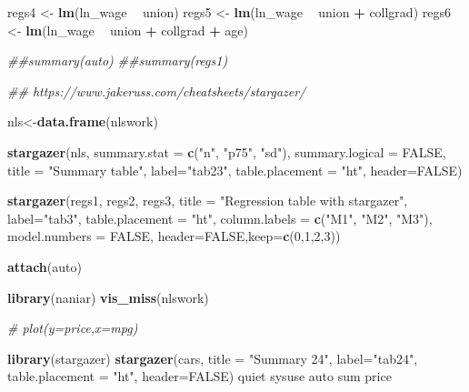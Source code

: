 \documentclass[
  12pt,
]{article}
\newenvironment{Shaded}{\begin{snugshade}}{\end{snugshade}}
\newcommand{\CommentTok}[1]{\textcolor[rgb]{0.56,0.35,0.01}{\textit{#1}}}
\newcommand{\DataTypeTok}[1]{\textcolor[rgb]{0.13,0.29,0.53}{#1}}
\newcommand{\DecValTok}[1]{\textcolor[rgb]{0.00,0.00,0.81}{#1}}
\newcommand{\KeywordTok}[1]{\textcolor[rgb]{0.13,0.29,0.53}{\textbf{#1}}}
\newcommand{\NormalTok}[1]{#1}
\newcommand{\OperatorTok}[1]{\textcolor[rgb]{0.81,0.36,0.00}{\textbf{#1}}}
\newcommand{\OtherTok}[1]{\textcolor[rgb]{0.56,0.35,0.01}{#1}}
\newcommand{\StringTok}[1]{\textcolor[rgb]{0.31,0.60,0.02}{#1}}
\begin{document}
\begin{Shaded}
\begin{Highlighting}[]
{\NormalTok{regs4 <-}\StringTok{ }\KeywordTok{lm}\NormalTok{(ln_wage }\OperatorTok{~}\StringTok{ }\NormalTok{union)}
\NormalTok{regs5 <-}\StringTok{ }\KeywordTok{lm}\NormalTok{(ln_wage }\OperatorTok{~}\StringTok{ }\NormalTok{union }\OperatorTok{+}\StringTok{ }\NormalTok{collgrad)}
\NormalTok{regs6 <-}\StringTok{ }\KeywordTok{lm}\NormalTok{(ln_wage }\OperatorTok{~}\StringTok{ }\NormalTok{union }\OperatorTok{+}\StringTok{ }\NormalTok{collgrad }\OperatorTok{+}\StringTok{ }\NormalTok{age)}

\CommentTok{##summary(auto)}
\CommentTok{##summary(regs1)}

\CommentTok{## https://www.jakeruss.com/cheatsheets/stargazer/}

\NormalTok{nls<-}\KeywordTok{data.frame}\NormalTok{(nlswork)}

\KeywordTok{stargazer}\NormalTok{(nls, }\DataTypeTok{summary.stat =} \KeywordTok{c}\NormalTok{(}\StringTok{"n"}\NormalTok{, }\StringTok{"p75"}\NormalTok{, }\StringTok{"sd"}\NormalTok{), }\DataTypeTok{summary.logical =} \OtherTok{FALSE}\NormalTok{, }
          \DataTypeTok{title =} \StringTok{"Summary table"}\NormalTok{,}
          \DataTypeTok{label=}\StringTok{"tab23"}\NormalTok{, }
          \DataTypeTok{table.placement =} \StringTok{"ht"}\NormalTok{, }
          \DataTypeTok{header=}\OtherTok{FALSE}\NormalTok{)}


\KeywordTok{stargazer}\NormalTok{(regs1, regs2, regs3,}
          \DataTypeTok{title =} \StringTok{"Regression table with stargazer"}\NormalTok{,}
          \DataTypeTok{label=}\StringTok{"tab3"}\NormalTok{, }
          \DataTypeTok{table.placement =} \StringTok{"ht"}\NormalTok{, }
          \DataTypeTok{column.labels =} \KeywordTok{c}\NormalTok{(}\StringTok{"M1"}\NormalTok{, }\StringTok{"M2"}\NormalTok{, }\StringTok{"M3"}\NormalTok{),}
          \DataTypeTok{model.numbers =} \OtherTok{FALSE}\NormalTok{,}
          \DataTypeTok{header=}\OtherTok{FALSE}\NormalTok{,}\DataTypeTok{keep=}\KeywordTok{c}\NormalTok{(}\DecValTok{0}\NormalTok{,}\DecValTok{1}\NormalTok{,}\DecValTok{2}\NormalTok{,}\DecValTok{3}\NormalTok{))}

\KeywordTok{attach}\NormalTok{(auto)}


\KeywordTok{library}\NormalTok{(naniar)}
\KeywordTok{vis_miss}\NormalTok{(nlswork)}

\CommentTok{# plot(y=price,x=mpg)}

\KeywordTok{library}\NormalTok{(stargazer)}
\KeywordTok{stargazer}\NormalTok{(cars, }
          \DataTypeTok{title =} \StringTok{"Summary 24"}\NormalTok{,}
          \DataTypeTok{label=}\StringTok{"tab24"}\NormalTok{, }
          \DataTypeTok{table.placement =} \StringTok{"ht"}\NormalTok{, }
          \DataTypeTok{header=}\OtherTok{FALSE}\NormalTok{)}
\NormalTok{quiet sysuse auto}
\NormalTok{sum price}

}
\end{Highlighting}
\end{Shaded}
\end{document}
